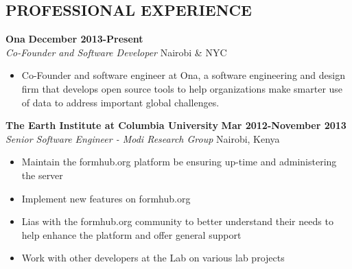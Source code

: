 \documentclass{res}
\begin{document}
\thispagestyle{empty} %

\address{ P.O. Box 14631 - 00100 \\   Nairobi, Kenya \\ +254.720.417.691}      
                                      
\address{larryweya@ona.io}

\begin{resume}
 
\section{PROFESSIONAL EXPERIENCE} 

\vspace{8pt}
\textbf{Ona} \hfill        \textbf{December 2013-Present} \\
\emph{Co-Founder and Software Developer}       \hfill   Nairobi \& NYC

\begin{itemize} \itemsep -2pt %
	\item Co-Founder and software engineer at Ona, a software engineering and design firm that develops open source tools to help organizations make smarter use of data to address important global challenges.

 \end{itemize} \vspace{-4pt}

\vspace{8pt}
\textbf{The Earth Institute at Columbia University} \hfill        \textbf{Mar 2012-November 2013} \\
\emph{Senior Software Engineer - Modi Research Group}       \hfill   Nairobi, 
Kenya

\begin{itemize} \itemsep -2pt %
        \item Maintain the formhub.org platform be ensuring up-time and 
        administering the server
        \item Implement new features on formhub.org
        \item Lias with the formhub.org community to better understand their 
        needs to help enhance the platform and offer general support
        \item Work with other developers at the Lab on various lab projects
 \end{itemize} \vspace{-4pt}


\end{resume}
\end{document}
